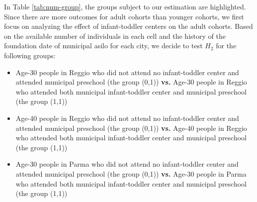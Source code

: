 \begin{table}[H] \caption{Number of Individuals in Each Group} \label{tab:num-group}
\end{table}

In Table \ref{tab:num-group}, the groups subject to our estimation are highlighted. Since there are more outcomes for adult cohorts than younger cohorts, we first focus on analyzing the effect of infant-toddler centers on the adult cohorts. Based on the available number of individuals in each cell and the history of the foundation date of municipal asilo for each city, we decide to test $H_2$ for the following groups:
\begin{itemize}
\item Age-30 people in Reggio who did not attend no infant-toddler center and attended municipal preschool (the group (0,1)) \textbf{vs.} Age-30 people in Reggio who attended both municipal infant-toddler center and municipal preschool (the group (1,1))
\item Age-40 people in Reggio who did not attend no infant-toddler center and attended municipal preschool (the group (0,1)) \textbf{vs.} Age-40 people in Reggio who attended both municipal infant-toddler center and municipal preschool (the group (1,1))
\item Age-30 people in Parma who did not attend no infant-toddler center and attended municipal preschool (the group (0,1)) \textbf{vs.} Age-30 people in Parma who attended both municipal infant-toddler center and municipal preschool (the group (1,1))
\end{itemize}

